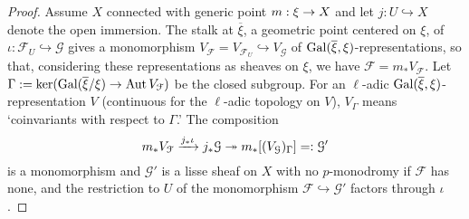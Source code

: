 \documentclass[deligne.tex]{subfiles}
\begin{document}
\begin{proof}
Assume $X$ connected with generic point $m:\xi\rightarrow X$ and let 
$j:U\hookrightarrow X$ denote the open immersion.
The stalk at $\overline\xi$, a geometric point centered on $\xi$, of
$\iota:\mathcal F_U\hookrightarrow\mathcal G$ gives a monomorphism
$V_{\mathcal F}=V_{\mathcal F_U}\hookrightarrow V_{\mathcal G}$ of
$\operatorname{Gal}(\overline\xi,\xi)$-representations, so that, considering these
representations as sheaves on $\xi$, we have $\mathcal F=m_*V_{\mathcal F}$.
Let $\Gamma:=\ker(\operatorname{Gal}(\overline\xi/\xi)\rightarrow\operatorname{Aut} V_{\mathcal F})$ be
the closed subgroup.
For an $\ell$-adic $\operatorname{Gal}(\overline\xi,\xi)$-representation $V$ (continuous
for the $\ell$-adic topology on $V$), $V_\Gamma$ means 
`coinvariants with respect to $\Gamma$.' The composition
\begin{equation*}
	m_*V_\mathcal F\xrightarrow{j_*\iota} j_*\mathcal G\twoheadrightarrow m_*[(V_\mathcal G)_\Gamma]=:\mathcal G'
\end{equation*}
is a monomorphism and $\mathcal G'$ is a lisse sheaf on $X$ with no
$p$-monodromy if $\mathcal F$ has none, and
the restriction to $U$ of the monomorphism
$\mathcal F\hookrightarrow\mathcal G'$ factors through $\iota$.
\end{proof}
\end{document}
